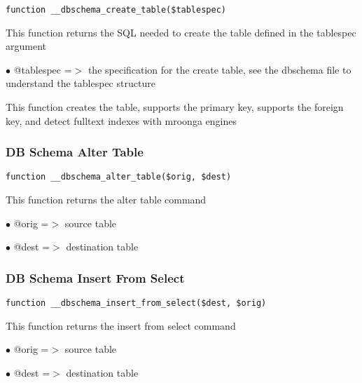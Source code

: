 \documentclass[a4paper]{article}
\begin{document}
\begin{lstlisting}
function __dbschema_create_table($tablespec)
\end{lstlisting}

This function returns the SQL needed to create the table defined in the
tablespec argument

\begin{compactitem}
\item[\color{myblue}$\bullet$] @tablespec =$>$ the specification for the create table, see the dbschema
              file to understand the tablespec structure
\end{compactitem}

This function creates the table, supports the primary key, supports the
foreign key, and detect fulltext indexes with mroonga engines

\hypertarget{toc430}{}
\subsubsection{DB Schema Alter Table}

\begin{lstlisting}
function __dbschema_alter_table($orig, $dest)
\end{lstlisting}

This function returns the alter table command

\begin{compactitem}
\item[\color{myblue}$\bullet$] @orig =$>$ source table
\item[\color{myblue}$\bullet$] @dest =$>$ destination table
\end{compactitem}

\hypertarget{toc431}{}
\subsubsection{DB Schema Insert From Select}

\begin{lstlisting}
function __dbschema_insert_from_select($dest, $orig)
\end{lstlisting}

This function returns the insert from select command

\begin{compactitem}
\item[\color{myblue}$\bullet$] @orig =$>$ source table
\item[\color{myblue}$\bullet$] @dest =$>$ destination table
\end{compactitem}
\end{document}
